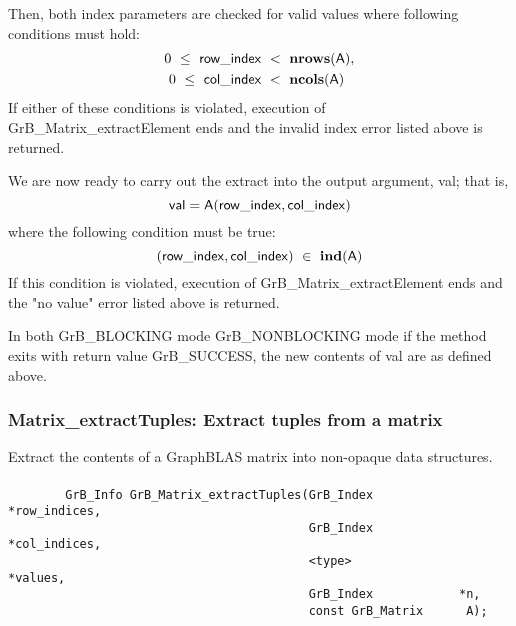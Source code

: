 Then, both index parameters are checked for valid values where following
conditions must hold:
\[
\begin{aligned}
    0\ \leq\ {\sf row\_index} & \ <\ \mathbf{nrows}({\sf A}), \\
    0\ \leq\ {\sf col\_index} & \ <\ \mathbf{ncols}({\sf A})
\end{aligned}
\]
If either of these conditions is violated, execution of 
{\sf GrB\_Matrix\_extractElement} ends and the invalid 
index error listed above is returned. 

We are now ready to carry out the extract into the output argument, {\sf val}; 
that is,
\[
{\sf val} = {\sf A}({\sf row\_index},{\sf col\_index})
\]
where the following condition must be true:
\[
    ({\sf row\_index},{\sf col\_index}) \ \in \ \mathbf{ind}({\sf A})
\]
If this condition is violated, execution of {\sf GrB\_Matrix\_extractElement} 
ends and the "no value" error listed above is returned.


In both {\sf GrB\_BLOCKING} mode {\sf GrB\_NONBLOCKING} mode
if the method exits with return value {\sf GrB\_SUCCESS}, the  new 
contents of  {\sf val} are as defined above.  



\subsubsection{{\sf Matrix\_extractTuples}: Extract tuples from a matrix}
\label{Sec:Matrix_extractTuples}

Extract the contents of a GraphBLAS matrix into non-opaque data structures.

\paragraph{\syntax}

\begin{verbatim}
        GrB_Info GrB_Matrix_extractTuples(GrB_Index            *row_indices,
                                          GrB_Index            *col_indices,
                                          <type>               *values, 
                                          GrB_Index            *n, 
                                          const GrB_Matrix      A);
\end{verbatim}

